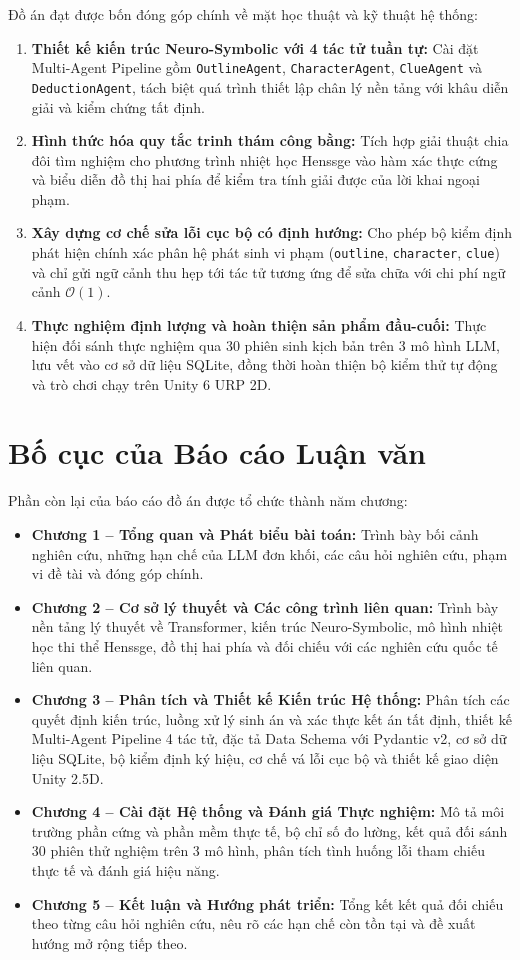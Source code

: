 Đồ án đạt được bốn đóng góp chính về mặt học thuật và kỹ thuật hệ thống:
\begin{enumerate}[leftmargin=1.5cm]
    \item \textbf{Thiết kế kiến trúc Neuro-Symbolic với 4 tác tử tuần tự:} Cài đặt Multi-Agent Pipeline gồm \texttt{OutlineAgent}, \texttt{CharacterAgent}, \texttt{ClueAgent} và \texttt{DeductionAgent}, tách biệt quá trình thiết lập chân lý nền tảng với khâu diễn giải và kiểm chứng tất định.
    \item \textbf{Hình thức hóa quy tắc trinh thám công bằng:} Tích hợp giải thuật chia đôi tìm nghiệm cho phương trình nhiệt học Henssge vào hàm xác thực cứng và biểu diễn đồ thị hai phía để kiểm tra tính giải được của lời khai ngoại phạm.
    \item \textbf{Xây dựng cơ chế sửa lỗi cục bộ có định hướng:} Cho phép bộ kiểm định phát hiện chính xác phân hệ phát sinh vi phạm (\texttt{outline}, \texttt{character}, \texttt{clue}) và chỉ gửi ngữ cảnh thu hẹp tới tác tử tương ứng để sửa chữa với chi phí ngữ cảnh $\mathcal{O}(1)$.
    \item \textbf{Thực nghiệm định lượng và hoàn thiện sản phẩm đầu-cuối:} Thực hiện đối sánh thực nghiệm qua 30 phiên sinh kịch bản trên 3 mô hình LLM, lưu vết vào cơ sở dữ liệu SQLite, đồng thời hoàn thiện bộ kiểm thử tự động và trò chơi chạy trên Unity 6 URP 2D.
\end{enumerate}

\section{Bố cục của Báo cáo Luận văn}
\label{sec:intro_structure}

Phần còn lại của báo cáo đồ án được tổ chức thành năm chương:
\begin{itemize}[leftmargin=1.5cm]
    \item \textbf{Chương 1 -- Tổng quan và Phát biểu bài toán:} Trình bày bối cảnh nghiên cứu, những hạn chế của LLM đơn khối, các câu hỏi nghiên cứu, phạm vi đề tài và đóng góp chính.
    \item \textbf{Chương 2 -- Cơ sở lý thuyết và Các công trình liên quan:} Trình bày nền tảng lý thuyết về Transformer, kiến trúc Neuro-Symbolic, mô hình nhiệt học thi thể Henssge, đồ thị hai phía và đối chiếu với các nghiên cứu quốc tế liên quan.
    \item \textbf{Chương 3 -- Phân tích và Thiết kế Kiến trúc Hệ thống:} Phân tích các quyết định kiến trúc, luồng xử lý sinh án và xác thực kết án tất định, thiết kế Multi-Agent Pipeline 4 tác tử, đặc tả Data Schema với Pydantic v2, cơ sở dữ liệu SQLite, bộ kiểm định ký hiệu, cơ chế vá lỗi cục bộ và thiết kế giao diện Unity 2.5D.
    \item \textbf{Chương 4 -- Cài đặt Hệ thống và Đánh giá Thực nghiệm:} Mô tả môi trường phần cứng và phần mềm thực tế, bộ chỉ số đo lường, kết quả đối sánh 30 phiên thử nghiệm trên 3 mô hình, phân tích tình huống lỗi tham chiếu thực tế và đánh giá hiệu năng.
    \item \textbf{Chương 5 -- Kết luận và Hướng phát triển:} Tổng kết kết quả đối chiếu theo từng câu hỏi nghiên cứu, nêu rõ các hạn chế còn tồn tại và đề xuất hướng mở rộng tiếp theo.
\end{itemize}
